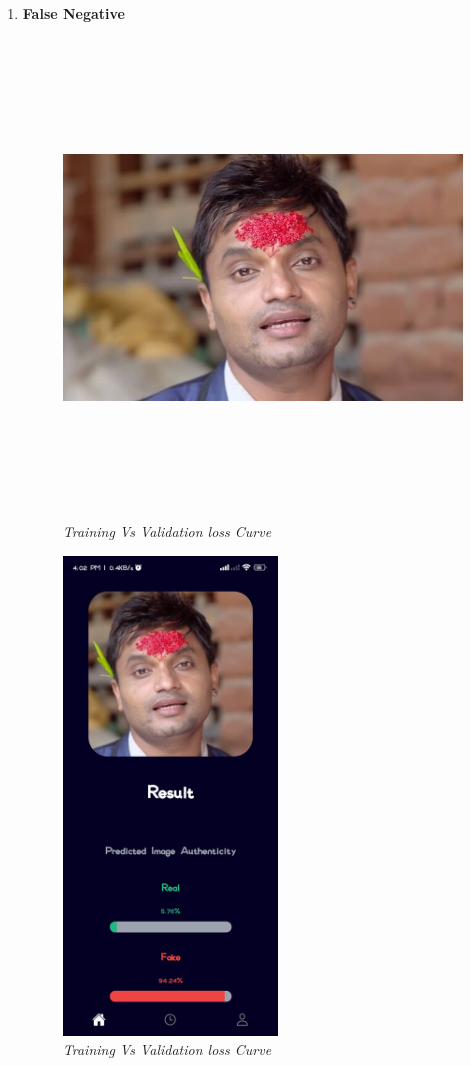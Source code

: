 \begin{enumerate}
          \newpage


    \item \textbf{False Negative}
          \begin{figure}[ht]
              \centering
              \includegraphics[width= 5in, height =5in ]{img/Nepali-Dashain-Tika-Pictures-Artists.jpg}
              \caption{\textit{Training Vs Validation loss Curve}}
          \end{figure}
          \begin{figure}[ht]
              \centering
              \includegraphics[height =5in ]{img/dashainResult.jpg}
              \caption{\textit{Training Vs Validation loss Curve}}
          \end{figure}


          \newpage

\end{enumerate}
